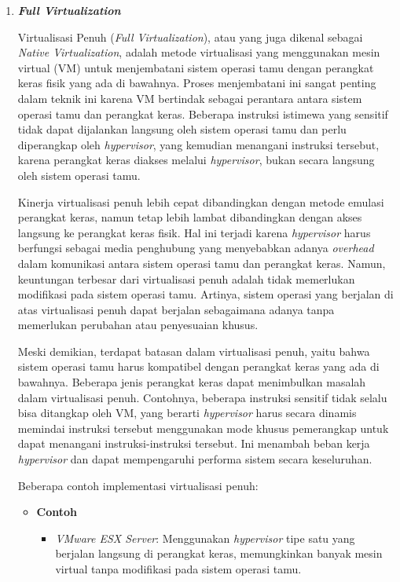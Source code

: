 \documentclass[12pt]{article}
\begin{document}
\begin{enumerate}
    \item \textbf{\textit{Full Virtualization}}
        \par Virtualisasi Penuh (\textit{Full Virtualization}), atau yang juga dikenal sebagai \textit{Native Virtualization}, adalah metode virtualisasi yang menggunakan mesin virtual (VM) untuk menjembatani sistem operasi tamu dengan perangkat keras fisik yang ada di bawahnya. Proses menjembatani ini sangat penting dalam teknik ini karena VM bertindak sebagai perantara antara sistem operasi tamu dan perangkat keras. Beberapa instruksi istimewa yang sensitif tidak dapat dijalankan langsung oleh sistem operasi tamu dan perlu diperangkap oleh \textit{hypervisor}, yang kemudian menangani instruksi tersebut, karena perangkat keras diakses melalui \textit{hypervisor}, bukan secara langsung oleh sistem operasi tamu.
    
    \par Kinerja virtualisasi penuh lebih cepat dibandingkan dengan metode emulasi perangkat keras, namun tetap lebih lambat dibandingkan dengan akses langsung ke perangkat keras fisik. Hal ini terjadi karena \textit{hypervisor} harus berfungsi sebagai media penghubung yang menyebabkan adanya \textit{overhead} dalam komunikasi antara sistem operasi tamu dan perangkat keras. Namun, keuntungan terbesar dari virtualisasi penuh adalah tidak memerlukan modifikasi pada sistem operasi tamu. Artinya, sistem operasi yang berjalan di atas virtualisasi penuh dapat berjalan sebagaimana adanya tanpa memerlukan perubahan atau penyesuaian khusus.
    
    \par Meski demikian, terdapat batasan dalam virtualisasi penuh, yaitu bahwa sistem operasi tamu harus kompatibel dengan perangkat keras yang ada di bawahnya. Beberapa jenis perangkat keras dapat menimbulkan masalah dalam virtualisasi penuh. Contohnya, beberapa instruksi sensitif tidak selalu bisa ditangkap oleh VM, yang berarti \textit{hypervisor} harus secara dinamis memindai instruksi tersebut menggunakan mode khusus pemerangkap untuk dapat menangani instruksi-instruksi tersebut. Ini menambah beban kerja \textit{hypervisor} dan dapat mempengaruhi performa sistem secara keseluruhan.
    
    \par Beberapa contoh implementasi virtualisasi penuh:
    \begin{itemize}
        \item \textbf{Contoh}
        \begin{itemize}
            \item \textit{VMware ESX Server}: Menggunakan \textit{hypervisor} tipe satu yang berjalan langsung di perangkat keras, memungkinkan banyak mesin virtual tanpa modifikasi pada sistem operasi tamu.
    

\end{itemize}
\end{itemize}
\end{enumerate}
\end{document}
